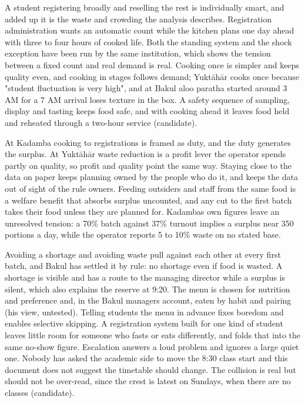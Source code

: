 \documentclass[
  10pt,
  table]{article}
\begin{document}
A student registering broadly and reselling the rest is individually smart, and added up it is the waste and crowding the analysis describes. Registration administration wants an automatic count while the kitchen plans one day ahead with three to four hours of cooked life. Both the standing system and the shock exception have been run by the same institution, which shows the tension between a fixed count and real demand is real. Cooking once is simpler and keeps quality even, and cooking in stages follows demand; Yuktāhār cooks once because "student fluctuation is very high", and at Bakul aloo paratha started around 3 AM for a 7 AM arrival loses texture in the box. A safety sequence of sampling, display and tasting keeps food safe, and with cooking ahead it leaves food held and reheated through a two-hour service (candidate).

At Kadamba cooking to registrations is framed as duty, and the duty generates the surplus. At Yuktāhār waste reduction is a profit lever the operator spends partly on quality, so profit and quality point the same way. Staying close to the data on paper keeps planning owned by the people who do it, and keeps the data out of sight of the rule owners. Feeding outsiders and staff from the same food is a welfare benefit that absorbs surplus uncounted, and any cut to the first batch takes their food unless they are planned for. Kadamba\textquotesingle s own figures leave an unresolved tension: a 70\% batch against 37\% turnout implies a surplus near 350 portions a day, while the operator reports 5 to 10\% waste on no stated base.

Avoiding a shortage and avoiding waste pull against each other at every first batch, and Bakul has settled it by rule: no shortage even if food is wasted. A shortage is visible and has a route to the managing director while a surplus is silent, which also explains the reserve at 9:20. The menu is chosen for nutrition and preference and, in the Bakul manager\textquotesingle s account, eaten by habit and pairing (his view, untested). Telling students the menu in advance fixes boredom and enables selective skipping. A registration system built for one kind of student leaves little room for someone who fasts or eats differently, and folds that into the same no-show figure. Escalation answers a loud problem and ignores a large quiet one. Nobody has asked the academic side to move the 8:30 class start and this document does not suggest the timetable should change. The collision is real but should not be over-read, since the crest is latest on Sundays, when there are no classes (candidate).
\end{document}
